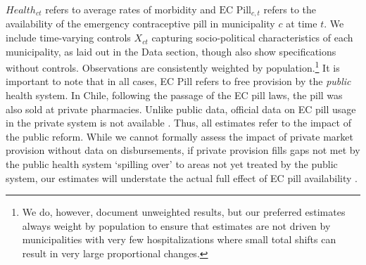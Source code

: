 \documentclass[12pt]{article}
\begin{document}
\begin{spacing}{1.9}
$Health_{ct}$ refers to average rates of morbidity and $\text{EC Pill}_{c,t}$ refers to
the availability of the emergency contraceptive pill in municipality $c$ at time $t$.
We include time-varying controls $X_{ct}$ capturing socio-political characteristics of
each municipality, as laid out in the Data section, though also show specifications
without controls.  Observations are consistently weighted by population.\footnote{We do,
  however, document unweighted results, %
  but our preferred estimates always weight by population to ensure that estimates are not
  driven by municipalities with very few hospitalizations where small total shifts can
  result in very large proportional changes.}  It is important to note that in all cases,
EC Pill refers to free provision by the \emph{public} health system.  In Chile, following
the passage of the EC pill laws, the pill was also sold at private pharmacies.  Unlike
public data, official data on EC pill usage in the private system is not available
\citep{Fernandezetal2016}. Thus, all estimates refer to the impact of the public reform.
While we cannot formally assess the impact of private market provision without data on
disbursements, if private provision fills gaps not met by the public health system
`spilling over' to areas not yet treated by the public system, our estimates will
understate the actual full effect of EC pill availability \citep{Clarke2019}.


\end{spacing}
\end{document}
